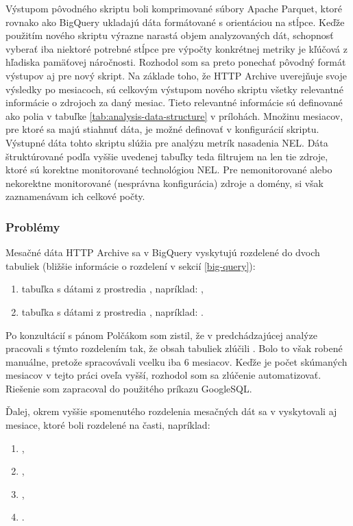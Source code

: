 Výstupom pôvodného skriptu boli komprimované súbory Apache Parquet, ktoré rovnako ako BigQuery ukladajú dáta formátované s orientáciou na stĺpce.
Keďže použitím nového skriptu výrazne narastá objem analyzovaných dát, schopnosť vyberať iba niektoré potrebné stĺpce pre výpočty konkrétnej metriky je kľúčová z hľadiska pamäťovej náročnosti.
Rozhodol som sa preto ponechať pôvodný formát výstupov aj pre nový skript. 
Na základe toho, že HTTP Archive uverejňuje svoje výsledky po mesiacoch, sú celkovým výstupom 
nového skriptu všetky relevantné informácie o zdrojoch za daný mesiac.
Tieto relevantné informácie sú definované ako polia v tabuľke \ref{tab:analysis-data-structure} v prílohách.
Množinu mesiacov, pre ktoré sa majú stiahnuť dáta, je možné definovať v konfigurácií skriptu.
Výstupné dáta tohto skriptu slúžia pre analýzu metrík nasadenia NEL.
Dáta štruktúrované podľa vyššie uvedenej tabuľky teda filtrujem na len tie zdroje, ktoré sú korektne monitorované technológiou NEL.
Pre nemonitorované alebo nekorektne monitorované (nesprávna konfigurácia) zdroje a domény, si však zaznamenávam ich celkové počty.

\subsubsection{Problémy}

Mesačné dáta HTTP Archive sa v BigQuery vyskytujú rozdelené do dvoch tabuliek (bližšie informácie o rozdelení v sekcií \ref{big-query}):
\begin{enumerate}
    \item tabuľka s dátami z prostredia , napríklad: ,
    \item tabuľka s dátami z prostredia , napríklad: .
\end{enumerate}

Po konzultácií s pánom Polčákom som zistil, že v predchádzajúcej analýze pracovali s týmto rozdelením tak, že obsah tabuliek zlúčili \cite{nel-http-archive}.
Bolo to však robené manuálne, pretože spracovávali vcelku iba 6 mesiacov.
Keďže je počet skúmaných mesiacov v tejto práci oveľa vyšší, rozhodol som sa zlúčenie automatizovať.
Riešenie som zapracoval do použitého príkazu GoogleSQL.

Ďalej, okrem vyššie spomenutého rozdelenia mesačných dát sa v vyskytovali aj mesiace, ktoré boli rozdelené na časti, napríklad:
\begin{enumerate}
    \item {},
    \item {},
    \item {},
    \item {}.
\end{enumerate}

